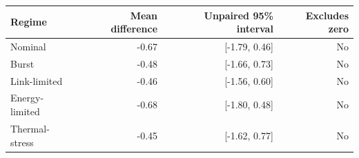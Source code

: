 \begin{tabular}{lrrr}
\toprule
Regime & Mean difference & Unpaired 95\% interval & Excludes zero \\
\midrule
Nominal & -0.67 & [-1.79, 0.46] & No \\
Burst & -0.48 & [-1.66, 0.73] & No \\
Link-limited & -0.46 & [-1.56, 0.60] & No \\
Energy-limited & -0.68 & [-1.80, 0.48] & No \\
Thermal-stress & -0.45 & [-1.62, 0.77] & No \\
\bottomrule
\end{tabular}